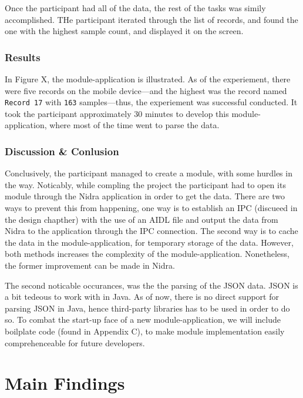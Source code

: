Once the participant had all of the data, the rest of the tasks was simily accomplished. THe participant iterated through the list of records, and found the one with the highest sample count, and displayed it on the screen. 

\subsubsection{Results}

In Figure X, the module-application is illustrated. As of the experiement, there were five records on the mobile device---and the highest was the record named \verb|Record 17| with \verb|163| samples---thus, the experiement was successful conducted. It took the participant approximately 30 minutes to develop this module-application, where most of the time went to parse the data.

\subsubsection{Discussion \& Conlusion}

Conclusively, the participant managed to create a module, with some hurdles in the way. Noticably, while compling the project the participant had to open its module through the Nidra application in order to get the data. There are two ways to prevent this from happening, one way is to establish an IPC (discueed in the design chapther) with the use of an AIDL file and output the data from Nidra to the application through the IPC connection. The second way is to cache the data in the module-application, for temporary storage of the data. However, both methods increases the complexity of the module-application. Nonetheless, the former improvement can be made in Nidra.

The second noticable occurances, was the the parsing of the JSON data. JSON is a bit tedeous to work with in Java. As of now, there is no direct support for parsing JSON in Java, hence third-party libraries has to be used in order to do so. To combat the start-up face of a new module-application, we will include boilplate code (found in Appendix C), to make module implementation easily comprehenceable for future developers.



\section{Main Findings}
